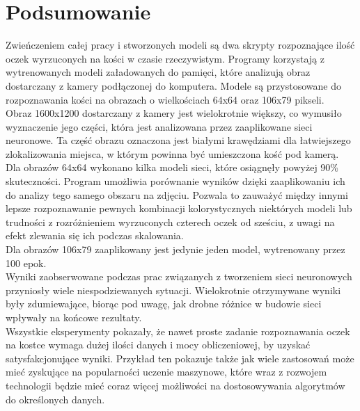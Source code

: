 
\chapter{Podsumowanie}

Zwieńczeniem całej pracy i stworzonych modeli są dwa skrypty rozpoznające ilość
oczek wyrzuconych na kości w czasie rzeczywistym. Programy korzystają z wytrenowanych
modeli załadowanych do pamięci, które analizują obraz dostarczany z kamery
podłączonej do komputera. Modele są przystosowane do rozpoznawania kości na
obrazach o wielkościach 64x64 oraz 106x79 pikseli.\\
Obraz 1600x1200 dostarczany z kamery jest wielokrotnie większy, co wymusiło wyznaczenie jego
części, która jest analizowana przez zaaplikowane sieci neuronowe. Ta część obrazu
oznaczona jest białymi krawędziami dla łatwiejszego zlokalizowania miejsca, w którym
powinna być umieszczona kość pod kamerą.
Dla obrazów 64x64 wykonano kilka modeli sieci, które osiągnęły powyżej 90\% skuteczności.
Program umożliwia porównanie wyników dzięki zaaplikowaniu ich do analizy tego
samego obszaru na zdjęciu. Pozwala to zauważyć między innymi lepsze rozpoznawanie
pewnych kombinacji kolorystycznych niektórych modeli lub trudności z rozróżnieniem
wyrzuconych czterech oczek od sześciu, z uwagi na efekt zlewania się ich podczas
skalowania.\\
Dla obrazów 106x79 zaaplikowany jest jedynie jeden model, wytrenowany przez 100 epok.\\
Wyniki zaobserwowane podczas prac związanych z tworzeniem sieci neuronowych przyniosły
wiele niespodziewanych sytuacji. Wielokrotnie otrzymywane wyniki były zdumiewające,
biorąc pod uwagę, jak drobne różnice w budowie sieci wpływały na końcowe rezultaty.\\
Wszystkie eksperymenty pokazały, że nawet proste zadanie rozpoznawania oczek na kostce
wymaga dużej ilości danych i mocy obliczeniowej, by uzyskać satysfakcjonujące wyniki.
Przykład ten pokazuje także jak wiele zastosowań może mieć zyskujące na popularności
uczenie maszynowe, które wraz z rozwojem technologii będzie mieć coraz więcej możliwości
na dostosowywania algorytmów do określonych danych.
